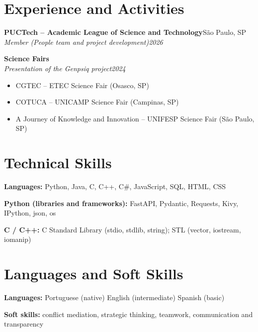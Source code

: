 \documentclass[letterpaper,11pt]{article}
\newcommand{\entry}[4]{%
  \vspace{3pt}
  \noindent\textbf{#1}\hfill #2\\
  \textit{#3}\hfill\textit{#4}\par
}
\newcommand{\skill}[2]{\noindent\textbf{#1:} #2\par\vspace{2pt}}
\begin{document}
\section{Experience and Activities}
\entry{PUCTech -- Academic League of Science and Technology}{São Paulo, SP}
  {Member (People team and project development)}{2026}

\entry{Science Fairs}{}{Presentation of the Genpsiq project}{2024}
\begin{itemize}
  \item CGTEC -- ETEC Science Fair (Osasco, SP)
  \item COTUCA -- UNICAMP Science Fair (Campinas, SP)
  \item A Journey of Knowledge and Innovation -- UNIFESP Science Fair (São Paulo, SP)
\end{itemize}

\section{Technical Skills}
\skill{Languages}{Python, Java, C, C++, C\#, JavaScript, SQL, HTML, CSS}
\skill{Python (libraries and frameworks)}{FastAPI, Pydantic, Requests, Kivy, IPython, json, os}
\skill{C / C++}{C Standard Library (stdio, stdlib, string); STL (vector, iostream, iomanip)}

\section{Languages and Soft Skills}
\skill{Languages}{Portuguese (native) \textbar{} English (intermediate) \textbar{} Spanish (basic)}
\skill{Soft skills}{conflict mediation, strategic thinking, teamwork, communication and transparency}
\end{document}
